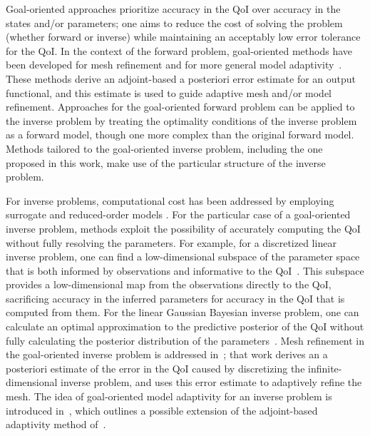 \documentclass[review,sort&compress]{elsarticle}
\begin{document}
Goal-oriented approaches prioritize accuracy in the QoI over accuracy in the states and/or parameters; one aims to reduce the cost of solving the problem (whether forward or inverse) while maintaining an acceptably low error tolerance for the QoI. In the context of the forward problem, goal-oriented methods have been developed for mesh refinement \cite{BecRann01,Park04,PrudOden99,VendDarm00,Yano12} and for more general model adaptivity~\cite{OdenVem00,VemOden01,BraackErn03,OdenPrudetal06}. These methods derive an adjoint-based a posteriori error estimate for an output functional, and this estimate is used to guide adaptive mesh and/or model refinement. Approaches for the goal-oriented forward problem can be applied to the inverse problem by treating the optimality conditions of the inverse problem as a forward model, though one more complex than the original forward model. Methods tailored to the goal-oriented inverse problem, including the one proposed in this work, make use of the particular structure of the inverse problem. 

For inverse problems, computational cost has been addressed by employing surrogate and reduced-order models \cite{MarzNajmRahn07, WangZab04, StefSanNav15, Frangosetal10}. For the particular case of a goal-oriented inverse problem, methods exploit the possibility of accurately computing the QoI without fully resolving the parameters. For example, for a discretized linear inverse problem, one can find a low-dimensional subspace of the parameter space that is both informed by observations and informative to the QoI~\cite{LiebWill13}. This subspace provides a low-dimensional map from the observations directly to the QoI, sacrificing accuracy in the inferred parameters for accuracy in the QoI that is computed from them. For the linear Gaussian Bayesian inverse problem, one can calculate an optimal approximation to the predictive posterior of the QoI without fully calculating the posterior distribution of the parameters~\cite{Span16}. Mesh refinement in the goal-oriented inverse problem is addressed in~\cite{BecVex05}; that work derives an a posteriori estimate of the error in the QoI caused by discretizing the infinite-dimensional inverse problem, and uses this error estimate to adaptively refine the mesh. The idea of goal-oriented model adaptivity for an inverse problem is introduced in~\cite{OdenPrudetal10}, which outlines a possible extension of the adjoint-based adaptivity method of~\cite{OdenPrudetal06}.
\end{document}
